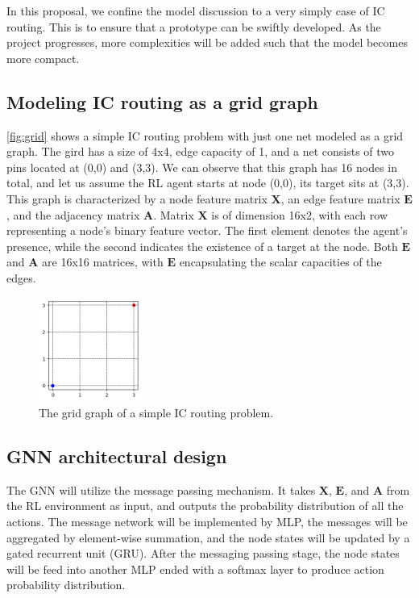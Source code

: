 \documentclass[letterpaper]{article}
\begin{document}
In this proposal, we confine the model discussion to a very simply case of IC routing. This is to ensure that a prototype can be swiftly developed. As the project progresses, more complexities will be added such that the model becomes more compact.
\subsection{Modeling IC routing as a grid graph}
\autoref{fig:grid} shows a simple IC routing problem with just one net modeled as a grid graph. The gird has a size of 4x4, edge capacity of 1, and a net consists of two pins located at (0,0) and (3,3). We can observe that this graph has 16 nodes in total, and let us assume the RL agent starts at node (0,0), its target sits at (3,3). This graph is characterized by a node feature matrix $\mathbf{X}$, an edge feature matrix $\mathbf{E}$, and the adjacency matrix $\mathbf{A}$. Matrix $\mathbf{X}$ is of dimension 16x2, with each row representing a node's binary feature vector. The first element denotes the agent's presence, while the second indicates the existence of a target at the node. Both $\mathbf{E}$ and $\mathbf{A}$ are 16x16 matrices, with $\mathbf{E}$ encapsulating the scalar capacities of the edges. 

\begin{figure}[h!]
    \centering
    \includegraphics[width=0.3\textwidth]{figure/grid_grap.png}
    \caption{The grid graph of a simple IC routing problem.}
    \label{fig:grid}
\end{figure}

\subsection{GNN architectural design}
The GNN will utilize the message passing mechanism. It takes $\mathbf{X}$, $\mathbf{E}$, and $\mathbf{A}$ from the RL environment as input, and outputs the probability distribution of all the actions. The message network will be implemented by MLP, the messages will be aggregated by element-wise summation, and the node states will be updated by a gated recurrent unit (GRU). After the messaging passing stage, the node states will be feed into another MLP ended with a softmax layer to produce action probability distribution. 
\end{document}
